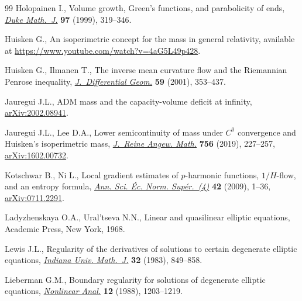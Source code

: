 \documentclass[10pt,a4paper]{amsart}
\numberwithin{equation}{section}
\begin{document}
\begin{thebibliography}{99}
Holopainen I., Volume growth, {G}reen's functions, and parabolicity of ends,
 \href{https://doi.org/10.1215/S0012-7094-99-09714-4}{\textit{Duke Math.~J.}} \textbf{97} (1999), 319--346.

Huisken G., An isoperimetric concept for the mass in general relativity,
 available at \url{https://www.youtube.com/watch?v=4aG5L49p428}.

Huisken G., Ilmanen T., The inverse mean curvature flow and the {R}iemannian
 {P}enrose inequality, \href{https://doi.org/10.4310/jdg/1090349447}{\textit{J.~Differential Geom.}} \textbf{59} (2001),
 353--437.

Jauregui J.L., {ADM} mass and the capacity-volume deficit at infinity,
 \href{https://arxiv.org/abs/2002.08941}{arXiv:2002.08941}.

Jauregui J.L., Lee D.A., Lower semicontinuity of mass under {$C^0$} convergence
 and {H}uisken's isoperimetric mass, \href{https://doi.org/10.1515/crelle-2017-0007}{\textit{J.~Reine Angew. Math.}}
 \textbf{756} (2019), 227--257, \href{https://arxiv.org/abs/1602.00732}{arXiv:1602.00732}.

Kotschwar B., Ni L., Local gradient estimates of {$p$}-harmonic functions,
 {$1/H$}-flow, and an entropy formula, \href{https://doi.org/10.24033/asens.2089}{\textit{Ann. Sci. \'Ec. Norm.
 Sup\'er.~(4)}} \textbf{42} (2009), 1--36, \href{https://arxiv.org/abs/0711.2291}{arXiv:0711.2291}.

Ladyzhenskaya O.A., Ural'tseva N.N., Linear and quasilinear elliptic equations,
 Academic Press, New York, 1968.

Lewis J.L., Regularity of the derivatives of solutions to certain degenerate
 elliptic equations, \href{https://doi.org/10.1512/iumj.1983.32.32058}{\textit{Indiana Univ. Math.~J.}} \textbf{32} (1983),
 849--858.

Lieberman G.M., Boundary regularity for solutions of degenerate elliptic
 equations, \href{https://doi.org/10.1016/0362-546X(88)90053-3}{\textit{Nonlinear Anal.}} \textbf{12} (1988), 1203--1219.


\end{thebibliography}
\end{document}
